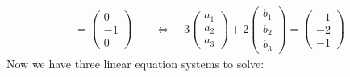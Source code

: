 \documentclass{article}
\begin{document}
\begin{align}
                = \left(\begin{matrix} 0\\-1\\0 \end{matrix}\right)\ \ \ \ \ 
            &\Leftrightarrow\ \ \ \ \  3 \left(\begin{matrix} a_1\\a_2\\a_3 \end{matrix}\right) + 2 \left(\begin{matrix} b_1\\b_2\\b_3 \end{matrix}\right)
                = \left(\begin{matrix} -1\\-2\\-1 \end{matrix}\right)
        \end{align}
\newpage
        Now we have three linear equation systems to solve:
\end{document}
